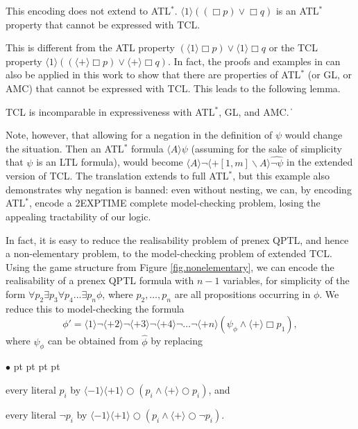 \documentclass{llncs}
\newcommand{\pfrr}{\Box}
\newcommand{\nxt}{\bigcirc}
\def\qed{\ifmmode\|\else{\unskip\nobreak\hfil
\penalty50\hskip1em\null\nobreak\hfil$\blacksquare$
\parfillskip=0pt\finalhyphendemerits=0\endgraf}\fi}
\newenvironment{list1}{\begin{list}{$\bullet$}
{\topsep 0 pt \parsep 0 pt \partopsep 0 pt \itemsep 0 pt}}{\end{list}}
\begin{document}
This encoding does not extend to ATL$^*$.
$\langle 1\rangle ((\pfrr p)\vee \pfrr q)$  is an ATL$^*$ property that cannot be 
expressed with TCL.

This is different from the 
ATL property $(\langle 1\rangle \pfrr p)\vee \langle 1\rangle\pfrr q$ 
or the
TCL property
\mbox{$\langle 1\rangle ((\langle+\rangle\pfrr p)\vee \langle +\rangle\pfrr q)$}. 
In fact, the proofs and examples in \cite{WHY11} 
can also be applied in this work to show that 
there are properties of ATL$^*$ (or GL, or AMC) 
that cannot be expressed with TCL.  
This leads to the following lemma. 

{\lemma \label{lemma.express.incomp2} 
TCL is incomparable in expressiveness with ATL$^*$, GL, and AMC.  
} 
\qed 

Note, however, that allowing for a negation in the definition of $\psi$ would change the situation.
Then an ATL$^*$ formula $\langle A \rangle \psi$ 
(assuming for the sake of simplicity that $\psi$ is an LTL formula), 
would become
$\langle A \rangle \neg \langle + [1,m] \smallsetminus A \rangle \widehat{\neg \psi}$ in the extended version of TCL.
The translation extends to full ATL$^*$, but this example also demonstrates why negation is banned: even without nesting, we can, by encoding ATL$^*$, encode a 2EXPTIME complete model-checking problem, losing the appealing tractability of our logic.

In fact, it is easy to reduce the realisability problem of prenex QPTL, and hence a non-elementary problem, to the model-checking problem of extended TCL.
Using the game structure from Figure \ref{fig.nonelementary}, we can encode the realisability of a prenex QPTL formula with $n-1$ variables, for simplicity of the form
$\forall p_2 \exists p_3 \forall p_4 \ldots \exists p_n \phi$, where $p_2,\ldots,p_n$ are all propositions occurring in $\phi$.
We reduce this to model-checking the formula 
\[\phi'=\langle 1 \rangle \neg \langle +2 \rangle \neg \langle +3 \rangle \neg \langle +4 \rangle \neg \ldots \neg \langle +n \rangle (\psi_\phi \wedge \langle + \rangle \pfrr p_1),\]
where $\psi_\phi$ can be obtained from $\widehat{\phi}$ by replacing
\begin{list1}
\item every literal $p_i$ by $\langle - 1 \rangle \langle + 1 \rangle \nxt (p_i \wedge \langle + \rangle \nxt p_i)$, and
\item every literal $\neg p_i$ by $\langle - 1 \rangle \langle + 1 \rangle \nxt (p_i \wedge \langle + \rangle \nxt \neg p_i)$.
\end{list1}
\end{document}
